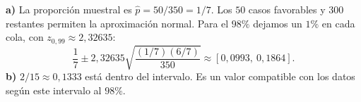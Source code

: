 \textbf{a)} La proporción muestral es $\hat p=50/350=1/7$. Los $50$ casos favorables y $300$ restantes permiten la aproximación normal. Para el $98\%$ dejamos un $1\%$ en cada cola, con $z_{0{,}99}\approx2{,}32635$:
\[
\frac17\pm 2{,}32635\sqrt{\frac{(1/7)(6/7)}{350}}
\approx\boxed{[0{,}0993,\ 0{,}1864]}.
\]
\textbf{b)} $2/15\approx0{,}1333$ está dentro del intervalo. Es un valor compatible con los datos según este intervalo al $98\%$.
